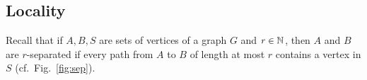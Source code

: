 \subsection{Locality}
Recall that if $A,B,S$ are sets of vertices of a graph $G$ and $r\in\mathbb{N}$,
then $A$ and $B$ are $r$-separated
if every path from $A$ to $B$ of length at most $r$ contains a vertex in $S$ (cf.~Fig.~\ref{fig:sep}).

